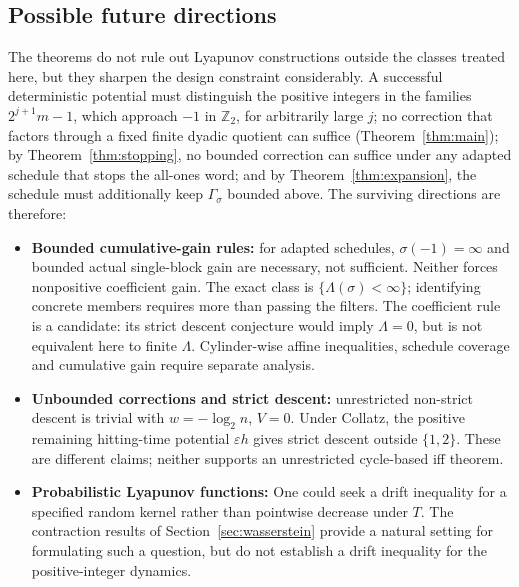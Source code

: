 \documentclass[11pt]{amsart}
\theoremstyle{definition}
\theoremstyle{remark}
\newcommand{\Z}{\mathbb{Z}}
\newcommand{\Ztwo}{\Z_2}
\begin{document}
\subsection*{Possible future directions}
The theorems do not rule out Lyapunov constructions outside the classes treated here, but they sharpen the design constraint considerably. A successful deterministic potential must distinguish the positive integers in the families $2^{j+1}m-1$, which approach $-1$ in $\Ztwo$, for arbitrarily large $j$; no correction that factors through a fixed finite dyadic quotient can suffice (Theorem~\ref{thm:main}); by Theorem~\ref{thm:stopping}, no bounded correction can suffice under any adapted schedule that stops the all-ones word; and by Theorem~\ref{thm:expansion}, the schedule must additionally keep $\Gamma_\sigma$ bounded above. The surviving directions are therefore:
\begin{itemize}
    \item \textbf{Bounded cumulative-gain rules:} for adapted schedules, $\sigma(-1)=\infty$ and bounded actual single-block gain are necessary, not sufficient. Neither forces nonpositive coefficient gain. The exact class is $\{\Lambda(\sigma)<\infty\}$; identifying concrete members requires more than passing the filters. The coefficient rule is a candidate: its strict descent conjecture would imply $\Lambda=0$, but is not equivalent here to finite $\Lambda$. Cylinder-wise affine inequalities, schedule coverage and cumulative gain require separate analysis.
    \item \textbf{Unbounded corrections and strict descent:} unrestricted non-strict descent is trivial with $w=-\log_2 n$, $V=0$. Under Collatz, the positive remaining hitting-time potential $\varepsilon h$ gives strict descent outside $\{1,2\}$. These are different claims; neither supports an unrestricted cycle-based iff theorem.
    \item \textbf{Probabilistic Lyapunov functions:} One could seek a drift inequality for a specified random kernel rather than pointwise decrease under $T$. The contraction results of Section~\ref{sec:wasserstein} provide a natural setting for formulating such a question, but do not establish a drift inequality for the positive-integer dynamics.
\end{itemize}
\end{document}
